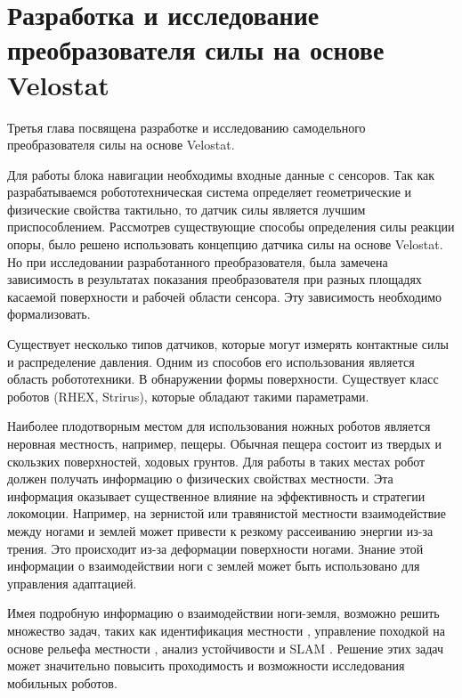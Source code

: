 \chapter{Разработка и исследование преобразователя силы на основе Velostat}\label{ch:ch3}

Третья глава посвящена разработке и исследованию самодельного преобразователя силы на основе Velostat.

Для работы блока навигации необходимы входные данные с сенсоров. Так как разрабатываемся робототехническая система определяет геометрические и физические свойства тактильно, то датчик силы является лучшим приспособлением. Рассмотрев существующие способы определения силы реакции опоры, было решено использовать концепцию датчика силы на основе Velostat. Но при исследовании разработанного преобразователя, была замечена зависимость в результатах показания преобразователя при разных площадях касаемой поверхности и рабочей области сенсора. Эту зависимость необходимо формализовать.

Существует несколько типов датчиков, которые могут измерять контактные силы и распределение давления. Одним из способов его использования является область робототехники. В обнаружении формы поверхности. Существует класс роботов (RHEX, Strirus), которые обладают такими параметрами.

Наиболее плодотворным местом для использования ножных роботов является неровная местность, например, пещеры. Обычная пещера состоит из твердых и скользких поверхностей, ходовых грунтов. Для работы в таких местах робот должен получать информацию о физических свойствах местности. Эта информация оказывает существенное влияние на эффективность и стратегии локомоции. Например, на зернистой или травянистой местности взаимодействие между ногами и землей может привести к резкому рассеиванию энергии из-за трения. Это происходит из-за деформации поверхности ногами. Знание этой информации о взаимодействии ноги с землей может быть использовано для управления адаптацией.

Имея подробную информацию о взаимодействии ноги-земля, возможно решить множество задач, таких как идентификация местности \cite{wuIntegratedGroundReaction2016, walasTerrainClassificationLocomotion2016, mrva_feature_2015, dallaire_learning_2015}, управление походкой на основе рельефа местности \cite{wuTactileSensingTerrainBased2020, weingarten_automated_2004}, анализ устойчивости и SLAM \cite{odenthal_nonlinear_1999, peters_analysis_2006, Altendorfer2001}. Решение этих задач может значительно повысить проходимость и возможности исследования мобильных роботов.

